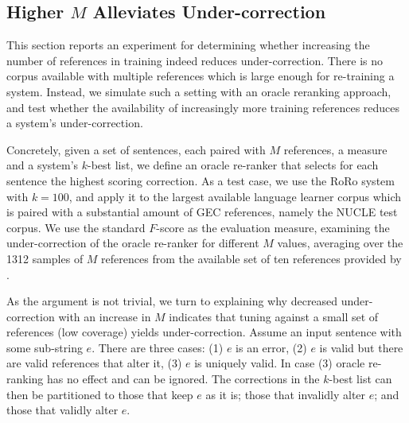 \documentclass[11pt, a4paper]{article}
\begin{document}
\subsection{Higher $M$ Alleviates Under-correction}\label{subsec:reranking}

This section reports an experiment for determining whether increasing
the number of references in training indeed reduces under-correction. There is no 
corpus available with multiple references which is large enough for re-training a system. 
Instead, we simulate such a setting with an oracle reranking approach, and test whether the 
availability of increasingly more training references reduces a system's under-correction.

Concretely, given a set of sentences, each paired with $M$ references, a measure and a 
system's $k$-best list, we define an oracle re-ranker that selects for each sentence the highest scoring correction.
As a test case, we use the RoRo system with $k=100$, and apply it to the 
largest available language learner corpus which is paired with a substantial amount of GEC references,
namely the NUCLE test corpus. We use the standard $F$-score as the evaluation measure,
examining the under-correction of the oracle re-ranker for different $M$ values, averaging over the 1312 samples of 
$M$ references from the available set of ten references provided by \citet{bryant2015far}.

As the argument is not trivial, we turn to explaining why decreased under-correction with an increase in $M$ indicates
that tuning against a small set of references (low coverage) yields under-correction. 
Assume an input sentence with some sub-string $e$. 
There are three cases: (1) $e$ is an error, (2) $e$ is valid but there are valid references that alter it, (3) $e$ is uniquely valid. In case (3) oracle re-ranking has no effect and can be ignored.
The corrections in the $k$-best list can then be partitioned to those that keep $e$ as it is; those that invalidly alter $e$; and those that validly alter $e$. 
\end{document}
